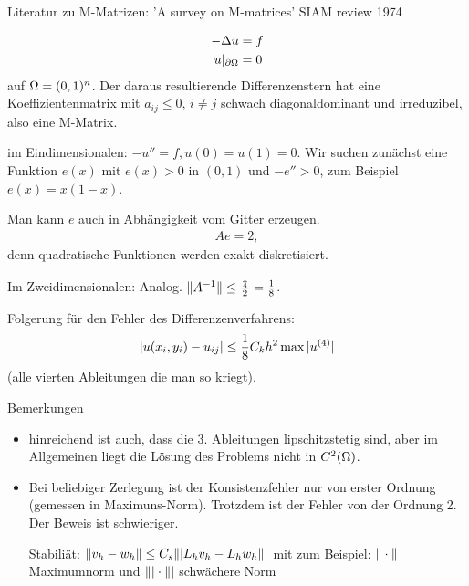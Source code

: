 
Literatur zu M-Matrizen: 'A survey on M-matrices' SIAM review 1974

\begin{beispiel}
  \begin{align*}
    -\Delta u &= f\\
 u|_{\partial \Omega} &= 0
  \end{align*}
auf $ \Omega = (0,1)^n$. Der daraus resultierende Differenzenstern hat eine Koeffizientenmatrix mit $a_{ij} \leq 0$, $i \neq j$ schwach diagonaldominant und irreduzibel, also eine M-Matrix.

im Eindimensionalen: $-u'' = f, u(0) = u(1) = 0$. Wir suchen zunächst eine Funktion $e(x)$ mit $e(x)>0$ in $(0,1)$ und $-e''>0$, zum Beispiel $e(x) = x(1-x)$.

Man kann $e$ auch in Abhängigkeit vom Gitter erzeugen.
\begin{align*}
  Ae = 2,
\end{align*} 
denn quadratische Funktionen werden exakt diskretisiert.

Im Zweidimensionalen: Analog. $\|A^{-1}\| \leq \frac{\frac 1 4}{2} = \frac 1 8$. 

Folgerung für den Fehler des Differenzenverfahrens:
\begin{align*}
  |u(x_i, y_i)-u_{ij}|\leq \frac 1 8 C_k h^2 \max |u^{(4)}|
\end{align*}
(alle vierten Ableitungen die man so kriegt).

Bemerkungen
\begin{itemize}
\item hinreichend ist auch, dass die 3. Ableitungen lipschitzstetig sind, aber im Allgemeinen liegt die Lösung des Problems nicht in $C^2(\Omega)$.
\item Bei beliebiger Zerlegung ist der Konsistenzfehler nur von erster Ordnung (gemessen in Maximuns-Norm). Trotzdem ist der Fehler von der Ordnung 2. Der Beweis ist schwieriger.

Stabiliät: $\|v_h -w_h\| \leq C_s \||L_hv_h - L_hw_h\||$ mit zum Beispiel: $\|\cdot\|$ Maximumnorm und $\||\cdot\||$ schwächere Norm
\end{itemize}
\end{beispiel}
